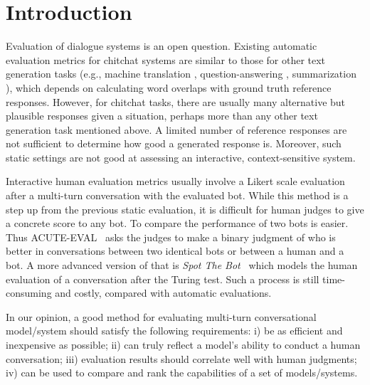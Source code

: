\section{Introduction}
\label{sec:intro}

Evaluation of dialogue systems is an open question. Existing
automatic evaluation metrics for chitchat systems are similar to those for 
other text generation tasks (e.g., machine translation \citep{papineni-etal-2002-bleu}, question-answering \citep{rajpurkar-etal-2016-squad}, 
summarization \citep{lin-2004-rouge}), which depends on calculating word overlaps with 
ground truth reference responses. 
However, for chitchat tasks, there are usually 
many alternative but plausible responses given a situation, 
perhaps more than any other text generation task mentioned above. 
A limited number of reference responses are 
not sufficient to determine how good a generated response is. 
Moreover, such static settings are not good at
assessing an interactive, context-sensitive system.

Interactive human evaluation metrics usually 
involve a Likert scale evaluation after a multi-turn conversation 
with the evaluated bot. 
While this method is a step up from the previous static evaluation, 
it is difficult for human judges to give a concrete score to
any bot.
To compare the performance of two bots is easier. 
Thus ACUTE-EVAL~\citep{DBLP:journals/corr/abs-1909-03087} asks the 
judges to make a binary judgment of who is better in conversations between two identical bots 
or between a human and a bot. A more advanced version of that
is \textit{Spot The Bot}~\cite{deriu-etal-2020-spot} which models the 
human evaluation of a 
conversation after the Turing test. Such a process is still 
time-consuming and costly, 
compared with automatic evaluations.

In our opinion, a good method for evaluating multi-turn conversational model/system 
should satisfy the following requirements:
i) be as efficient and inexpensive as possible;
ii) can truly reflect a model's ability to conduct a human conversation; 
iii) evaluation results should correlate well with human judgments;
iv) can be used to compare and rank the capabilities of a set of models/systems.
  

